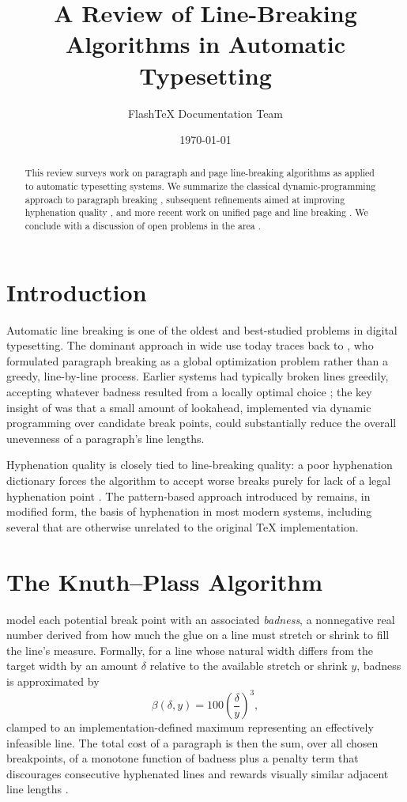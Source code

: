 \documentclass[11pt]{article}
\title{A Review of Line-Breaking Algorithms in Automatic Typesetting}
\author{FlashTeX Documentation Team}
\date{\today}
\begin{document}
\maketitle

\begin{abstract}
This review surveys work on paragraph and page line-breaking algorithms as
applied to automatic typesetting systems. We summarize the classical
dynamic-programming approach to paragraph breaking \citep{knuthplass1981},
subsequent refinements aimed at improving hyphenation quality
\citep{liang1983}, and more recent work on unified page and line breaking
\citep{plass1981,hobby1986,frank1990}. We conclude with a discussion of
open problems in the area \citep{barron1995,unicode2000}.
\end{abstract}

\section{Introduction}

Automatic line breaking is one of the oldest and best-studied problems in
digital typesetting. The dominant approach in wide use today traces back to
\citet{knuthplass1981}, who formulated paragraph breaking as a global
optimization problem rather than a greedy, line-by-line process. Earlier
systems had typically broken lines greedily, accepting whatever badness
resulted from a locally optimal choice \citep{plass1981}; the key insight
of \citet{knuthplass1981} was that a small amount of lookahead, implemented
via dynamic programming over candidate break points, could substantially
reduce the overall unevenness of a paragraph's line lengths.

Hyphenation quality is closely tied to line-breaking quality: a poor
hyphenation dictionary forces the algorithm to accept worse breaks purely
for lack of a legal hyphenation point \citep{liang1983}. The
pattern-based approach introduced by \citeauthor{liang1983}
\citeyearpar{liang1983} remains, in modified form, the basis of
hyphenation in most modern systems, including several that are otherwise
unrelated to the original \TeX{} implementation.

\section{The Knuth--Plass Algorithm}

\citet{knuthplass1981} model each potential break point with an associated
\emph{badness}, a nonnegative real number derived from how much the glue on
a line must stretch or shrink to fill the line's measure. Formally, for a
line whose natural width differs from the target width by an amount
$\delta$ relative to the available stretch or shrink $y$, badness is
approximated by
\[
  \beta(\delta, y) = 100 \left( \frac{\delta}{y} \right)^3,
\]
clamped to an implementation-defined maximum representing an effectively
infeasible line. The total cost of a paragraph is then the sum, over all
chosen breakpoints, of a monotone function of badness plus a penalty term
that discourages consecutive hyphenated lines and rewards visually similar
adjacent line lengths \citep[see][p.~14]{knuthplass1981}.
\end{document}
